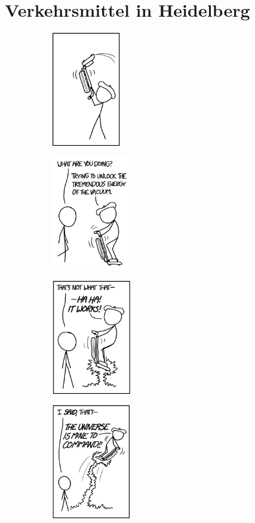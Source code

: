 \section{Verkehrsmittel in Heidelberg}
\label{verkehrsmittel}

\begin{figure}[b]
    \centering
    \begin{subfigure}{.24\textwidth}
	\includegraphics[height=5cm]{bilder/vacuum_1.png}
    \end{subfigure}
    \begin{subfigure}{.24\textwidth}
	\includegraphics[height=5cm]{bilder/vacuum_2.png}
    \end{subfigure}
    \begin{subfigure}{.24\textwidth}
	\includegraphics[height=5cm]{bilder/vacuum_3.png}
    \end{subfigure}
    \begin{subfigure}{.24\textwidth}
	\includegraphics[height=5cm]{bilder/vacuum_4.png}
    \end{subfigure}
\end{figure}


